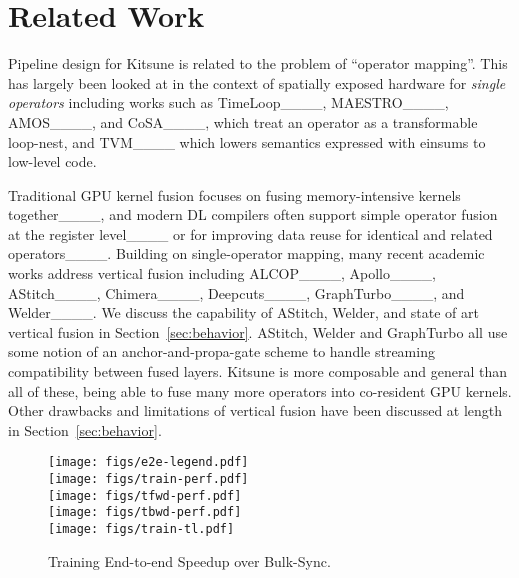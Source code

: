 \section{Related Work}
\label{sec:relwork}

 Pipeline design for Kitsune is related to the problem of ``operator mapping''. This has largely been looked at in the context of spatially exposed hardware for \textit{single operators} including works such as TimeLoop____, MAESTRO____, AMOS____, and CoSA____, which treat an operator as a transformable loop-nest, and TVM____ which lowers semantics expressed with einsums to low-level code. 

 Traditional GPU kernel fusion focuses on fusing memory-intensive kernels together____, and modern DL compilers often support simple operator fusion at the register level____ or for improving data reuse for identical and related operators____.
Building on single-operator mapping, many recent academic works address vertical fusion including ALCOP____, Apollo____, AStitch____,   Chimera____, Deepcuts____, GraphTurbo____, and Welder____. We discuss the capability of AStitch, Welder, and state of art vertical fusion in Section~\ref{sec:behavior}. AStitch, Welder and GraphTurbo all use some notion of an anchor-and-propa-gate scheme to handle streaming compatibility between fused layers. Kitsune is more composable and general than all of these, being able to fuse many more operators into co-resident GPU kernels. Other drawbacks and limitations of vertical fusion have been discussed at length in Section~\ref{sec:behavior}.


\begin{figure}[t]
    \centering
    \hspace{0.5in}
    \texttt{[image: figs/e2e-legend.pdf]} \\
    \texttt{[image: figs/train-perf.pdf]} \\
    \vspace{0.1in}
    \texttt{[image: figs/tfwd-perf.pdf]} \\
    \vspace{0.1in}
    \texttt{[image: figs/tbwd-perf.pdf]} \\
    \vspace{0.1in}
    \texttt{[image: figs/train-tl.pdf]} \\
    \vspace{-0.1in}
    \caption{Training End-to-end Speedup over Bulk-Sync.}
    \label{fig:train-perf-tl}
    \vspace{-0.2in}
\end{figure}   

